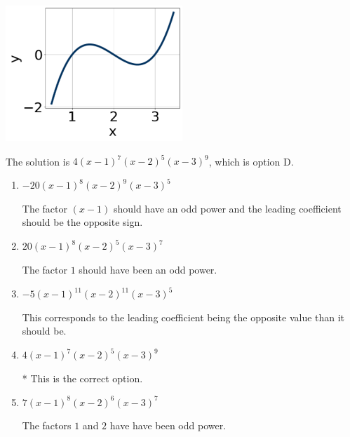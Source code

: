 \documentclass{extbook}[14pt]
\begin{document}
\begin{enumerate}
{\begin{center}
    \includegraphics[width=0.5\textwidth]{../Figures/polyGraphToFunctionB.png}
\end{center}


The solution is \( 4(x - 1)^{7} (x - 2)^{5} (x - 3)^{9} \), which is option D.\begin{enumerate}[label=\Alph*.]
\item \( -20(x - 1)^{8} (x - 2)^{9} (x - 3)^{5} \)

The factor $(x - 1)$ should have an odd power and the leading coefficient should be the opposite sign.
\item \( 20(x - 1)^{8} (x - 2)^{5} (x - 3)^{7} \)

The factor $1$ should have been an odd power.
\item \( -5(x - 1)^{11} (x - 2)^{11} (x - 3)^{5} \)

This corresponds to the leading coefficient being the opposite value than it should be.
\item \( 4(x - 1)^{7} (x - 2)^{5} (x - 3)^{9} \)

* This is the correct option.
\item \( 7(x - 1)^{8} (x - 2)^{6} (x - 3)^{7} \)

The factors $1$ and $2$ have have been odd power.
\end{enumerate}

}
\end{enumerate}
\end{document}
